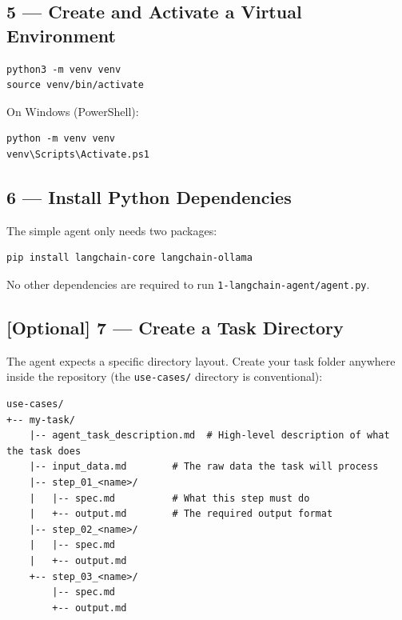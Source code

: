 \documentclass[12pt, a4paper]{article}
\begin{document}
\subsection{5 — Create and Activate a Virtual Environment}

\begin{lstlisting}[style=shellstyle]
python3 -m venv venv
source venv/bin/activate
\end{lstlisting}

On Windows (PowerShell):

\begin{lstlisting}[style=shellstyle]
python -m venv venv
venv\Scripts\Activate.ps1
\end{lstlisting}

\subsection{6 — Install Python Dependencies}

The simple agent only needs two packages:

\begin{lstlisting}[style=shellstyle]
pip install langchain-core langchain-ollama
\end{lstlisting}

No other dependencies are required to run \texttt{1-langchain-agent/agent.py}.

\subsection{[Optional] 7 — Create a Task Directory}

The agent expects a specific directory layout. Create your task folder anywhere inside the repository (the \texttt{use-cases/} directory is conventional):

\begin{lstlisting}[language={}]
use-cases/
+-- my-task/
    |-- agent_task_description.md  # High-level description of what the task does
    |-- input_data.md        # The raw data the task will process
    |-- step_01_<name>/
    |   |-- spec.md          # What this step must do
    |   +-- output.md        # The required output format
    |-- step_02_<name>/
    |   |-- spec.md
    |   +-- output.md
    +-- step_03_<name>/
        |-- spec.md
        +-- output.md
\end{lstlisting}
\end{document}
